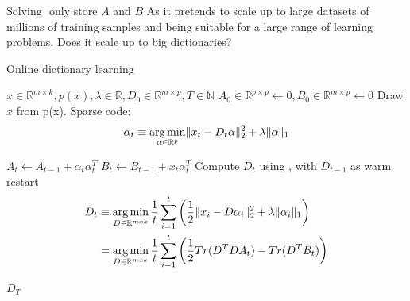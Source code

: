 Solving $ $ 
only store $A$ and $B$ 
As it pretends to scale up to large datasets of millions of training samples
and being suitable for a large range of learning problems.
Does it scale up to big dictionaries?

\begin{algorithm}[H]
\caption[\trainDL]{Online dictionary learning}
\label{alg:trainDL}
\begin{algorithmic}[1]
\REQUIRE $x \in \mathbb{R}^{m \times k},  p \left( x \right), \lambda \in \mathbb{R}, D_0 \in \mathbb{R}^{m \times p}, T \in \mathbb{N}$
\STATE $A_0 \in \mathbb{R}^{p \times p} \gets  0, B_0 \in \mathbb{R}^{m \times p}\gets 0$
\STATE Draw $x$ from p(x).
\STATE Sparse code:
\begin{align*} 
\alpha_t \equiv \operatorname*{arg\,min}_{\alpha\in\mathbb{R}^{p}}  \lVert x_t - D_t\alpha \rVert^{2}_{2}  +  \lambda \lVert \alpha \rVert_{1}
\end{align*}

\STATE $A_t \gets A_{t-1} + \alpha_t\alpha_t^T$\label{alg:Aupdate}
\STATE $B_t \gets B_{t-1} + x_t\alpha_t^T$\label{alg:Bupdate}
\STATE Compute $D_t$ using , with $D_{t-1}$ as warm restart 
\begin{equation}
\begin{split}
D_t  & \equiv \operatorname*{arg\,min}_{D \in \mathbb{R}^{m x k}}  \frac{1}{t} \sum_{i=1}^t
\left( \frac{1}{2} \lVert x_i - D\alpha_i \rVert^{2}_{2}  +  \lambda \lVert
\alpha_i \rVert_{1} \right) \\
& = \operatorname*{arg\,min}_{D \in \mathbb{R}^{m x k}}  \frac{1}{t} \sum_{i=1}^t
\left( \frac{1}{2} Tr(D^TDA_t) - Tr(D^TB_t)\right) \label{eq:update}
\end{split}
\end{equation}
 
\ENDFOR
\RETURN $D_T$
\end{algorithmic}
\end{algorithm}


